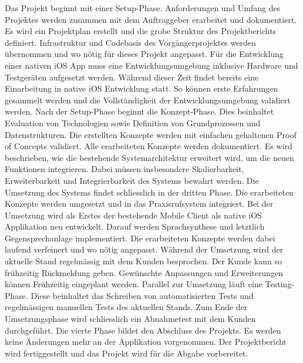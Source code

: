 Das Projekt beginnt mit einer Setup-Phase.
Anforderungen und Umfang des Projektes werden zusammen mit dem Auftraggeber erarbeitet und dokumentiert.
Es wird ein Projektplan erstellt und die grobe Struktur des Projektberichts definiert.
Infrastruktur und Codebasis des Vorgängerprojektes werden übernommen und wo nötig für dieses Projekt angepasst.
Für die Entwicklung einer nativen iOS App muss eine Entwicklungsumgebung inklusive Hardware und Testgeräten aufgesetzt werden.
Während dieser Zeit findet bereits eine Einarbeitung in native iOS Entwicklung statt.
So können erste Erfahrungen gesammelt werden und die Vollständigkeit der Entwicklungsumgebung validiert werden.
Nach der Setup-Phase beginnt die Konzept-Phase.
Dies beinhaltet Evaluation von Technologien sowie Definition von Grundprozessen und Datenstrukturen.
Die erstellten Konzepte werden mit einfachen gehaltenen Proof of Concepts validiert.
Alle erarbeiteten Konzepte werden dokumentiert.
Es wird beschrieben, wie die bestehende Systemarchitektur erweitert wird, um die neuen Funktionen integrieren.
Dabei müssen insbesondere Skalierbarkeit, Erweiterbarkeit und Integrierbarkeit des Systems bewahrt werden.
Die Umsetzung des Systems findet schliesslich in der dritten Phase.
Die erarbeiteten Konzepte werden umgesetzt und in das Praxisrufsystem integriert.
Bei der Umsetzung wird als Erstes der bestehende Mobile Client als native iOS Applikation neu entwickelt.
Darauf werden Sprachsynthese und letztlich Gegensprechanlage implementiert.
Die erarbeiteten Konzepte werden dabei laufend verfeinert und wo nötig angepasst.
Während der Umsetzung wird der aktuelle Stand regelmässig mit dem Kunden besprochen.
Der Kunde kann so frühzeitig Rückmeldung geben.
Gewünschte Anpassungen und Erweiterungen können Frühzeitig eingeplant werden.
Parallel zur Umsetzung läuft eine Testing-Phase.
Diese beinhaltet das Schreiben von automatisierten Tests und regelmässigen manuellen Tests des aktuellen Stands.
Zum Ende der Umsetzungsphase wird schliesslich ein Abnahmetest mit dem Kunden durchgeführt.
Die vierte Phase bildet den Abschluss des Projekts.
Es werden keine Änderungen mehr an der Applikation vorgenommen.
Der Projektbericht wird fertiggestellt und das Projekt wird für die Abgabe vorbereitet.

